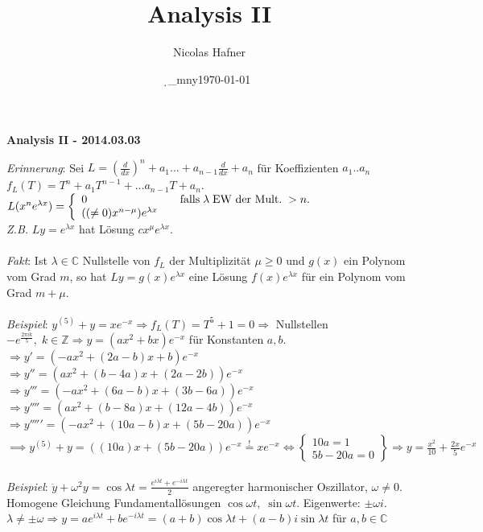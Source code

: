 \documentclass[12pt,a4paper,titlepage]{article}
\author{Nicolas Hafner}
\title{Analysis II}
\date{\d_mny\today}
\newcommand{\setC}{\mathbb{C}}
\newcommand{\setZ}{\mathbb{Z}}
\begin{document}
	
\begin{center}{\bfseries\Huge Analysis II - 2014.03.03}\end{center}
\textit{Erinnerung}: Sei $L=(\frac{d}{dx})^n+a_1...+a_{n-1}\frac{d}{dx}+a_n$ für Koeffizienten $a_1..a_n$ \\
$f_L(T)=T^n+a_1T^{n-1}+...a_{n-1}T+a_n$.
$L(x^ne^{\lambda x})=\left\{\begin{array}{l l}
    0 & \quad \text{falls}\; \lambda\; \text{EW der Mult.}\; >n. \\
    ((\neq 0)x^{n-\mu})e^{\lambda x} & 
  \end{array}\right.$ \\
\textit{Z.B.} $Ly=e^{\lambda x}$ hat Lösung $cx^\mu e^{\lambda x}$.\\
\\
\textit{Fakt}: Ist $\lambda\in\setC$ Nullstelle von $f_L$ der Multiplizität $\mu\geq 0$ und $g(x)$ ein Polynom vom Grad $m$, so hat $Ly=g(x)e^{\lambda x}$ eine Lösung $f(x)e^{\lambda x}$ für ein Polynom vom Grad $m+\mu$. \\
\\
\textit{Beispiel}: $y^{(5)}+y=xe^{-x} \Rightarrow f_L(T)=T^5+1=0 \Rightarrow$ Nullstellen $-e^{\frac{2\pi ik}{5}},\;k\in\setZ \Rightarrow y=(ax^2+bx)e^{-x}$ für Konstanten $a,b$. \\
$\Rightarrow y'=(-ax^2+(2a-b)x+b)e^{-x}$ \\
$\Rightarrow y''=(ax^2+(b-4a)x+(2a-2b))e^{-x}$ \\
$\Rightarrow y'''=(-ax^2+(6a-b)x+(3b-6a))e^{-x}$ \\
$\Rightarrow y''''=(ax^2+(b-8a)x+(12a-4b))e^{-x}$ \\
$\Rightarrow y'''''=(-ax^2+(10a-b)x+(5b-20a))e^{-x}$ \\
$\implies y^{(5)}+y=((10a)x+(5b-20a))e^{-x} \overset{!}{=}xe^{-x} \iff \left\{\begin{array}{l}10a=1 \\ 5b-20a=0\end{array}\right\} \Rightarrow y=\frac{x^2}{10}+\frac{2x}{5}e^{-x}$\\
\\
\textit{Beispiel}: $\ddot y+\omega^2y=\cos\lambda t = \frac{e^{i\lambda t}+e^{-i\lambda t}}{2}$ angeregter harmonischer Oszillator, $\omega\neq 0$. Homogene Gleichung Fundamentallösungen $\cos\omega t,\; \sin\omega t$. Eigenwerte: $\pm \omega i$. \\
$\lambda\neq\pm\omega \Rightarrow y=ae^{i\lambda t}+be^{-i\lambda t}=(a+b)\cos\lambda t+(a-b)i\sin\lambda t$ für $a,b\in\setC$ \\
\end{document}
